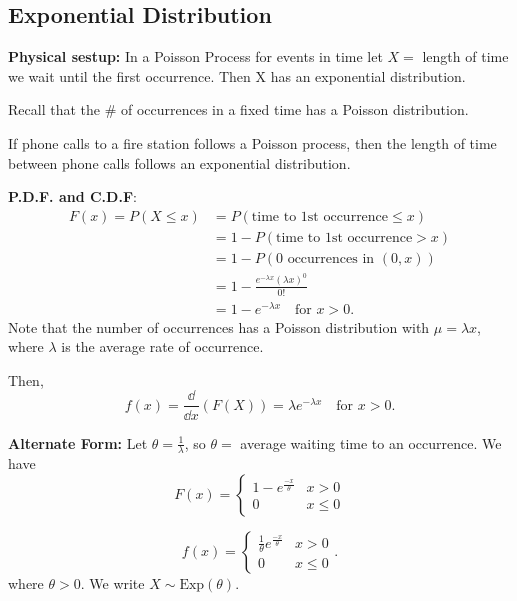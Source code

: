 \subsection{Exponential Distribution}

\textbf{Physical sestup:} In a Poisson Process for events in time let $X = $ length of time we wait until the first
occurrence. Then X has an exponential distribution.

\begin{note}
    Recall that the $\#$ of occurrences in a fixed time has a Poisson distribution.
\end{note}

\begin{example}
    If phone calls to a fire station follows a Poisson process, then the length of time between phone calls follows an exponential distribution.
\end{example}


\textbf{P.D.F. and C.D.F}:
\begin{align*}
    F(x) = P(X \leq x) &= P(\text{time to 1st occurrence} \leq x) \\
    &= 1 - P(\text{time to 1st occurrence} > x) \\
    &= 1 - P(\text{0 occurrences in $(0,x)$}) \\
    &= 1 - \frac{e^{-\lambda x}(\lambda x)^0}{0!} \\
    &= 1 - e^{-\lambda x} \quad \text{for $x > 0$}.
\end{align*}
Note that the number of occurrences has a Poisson distribution with $\mu = \lambda x$, where $\lambda$ is the average rate of occurrence.

Then,
\[
    f(x) = \frac{\dd}{\dd{x}} \left( F(X) \right) = \lambda e^{-\lambda x} \quad \text{for $x > 0$}.
\]


\textbf{Alternate Form:} Let $\theta = \frac{1}{\lambda}$, so $\theta = $ average waiting time to an occurrence. 
We have
\[
    F(x) = 
    \begin{cases} 
    1 - e^{\frac{-x}{\theta}} & x > 0 \\
    0 & x \leq 0
    \end{cases}
\]

\[
    f(x) = 
    \begin{cases} 
    \frac{1}{\theta} e^{\frac{-x}{\theta}} & x > 0 \\
    0 & x \leq 0
    \end{cases}.
\]
where $\theta > 0$. We write $X \sim \text{Exp}(\theta)$. 

